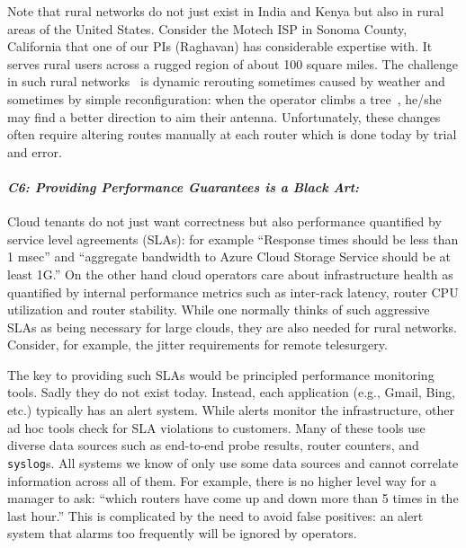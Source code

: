 Note that rural networks do not just exist in India and Kenya but also in rural areas of the United States. Consider the Motech ISP in Sonoma County, California that one of our PIs (Raghavan) has considerable expertise with. It serves rural users across a rugged region of about 100 square miles. The challenge in such rural networks~\cite{barathwisp} is dynamic rerouting sometimes caused by weather and sometimes by simple reconfiguration: when the operator climbs a tree~\cite{barathwisp}, he/she may find a better direction to aim their antenna.  Unfortunately, these changes often require altering routes manually at each router which is done today by trial and error.

\paragraph*{\em C6: Providing Performance Guarantees is a Black Art:}
Cloud tenants do not just want correctness but also performance quantified by service level agreements (SLAs): for example ``Response times should be less than 1 msec'' and ``aggregate bandwidth to Azure Cloud Storage Service should be at least 1G.''
On the other hand cloud operators care about infrastructure health as quantified by internal performance metrics such as inter-rack latency, router CPU utilization and router stability.  While
one normally thinks of such aggressive SLAs as being necessary for large clouds, they are also
needed for rural networks.  Consider, for example, the jitter requirements for remote telesurgery.

The key to providing such SLAs would be principled performance monitoring tools. Sadly they do not exist today. Instead, each application (e.g., Gmail, Bing, etc.) typically has an alert system. While alerts monitor the infrastructure, other ad hoc tools check for SLA violations to customers.  Many of these tools use diverse data sources such as end-to-end probe results, router counters, and \texttt{syslog}s.  All systems we know of only use some data sources and cannot correlate information across all of them.  For example, there is no higher level way for a manager to ask: ``which routers have come up and down more than 5 times in the last hour.''  This is complicated by the need to avoid false positives: an alert system that alarms too frequently will be ignored by operators.


